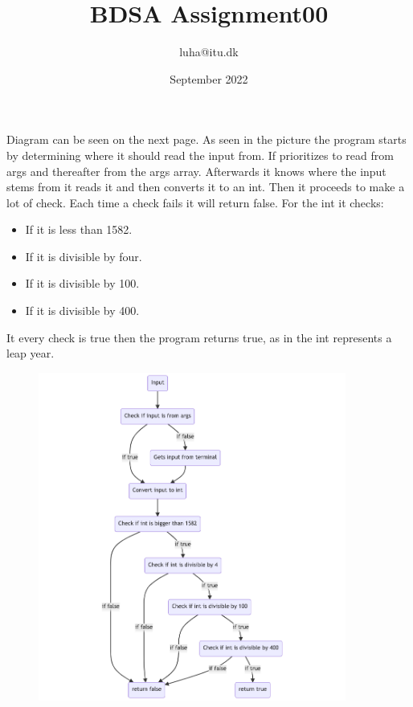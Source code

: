 \documentclass[12pt, a4paper]{article}
\title{BDSA Assignment00}
\author{luha@itu.dk}
\date{September 2022}
\begin{document}
\maketitle

Diagram can be seen on the next page. As seen in the picture the program starts by determining where it should read the input from. If prioritizes to read from args and thereafter from the args array. 
Afterwards it knows where the input stems from it reads it and then converts it to an int. 
Then it proceeds to make a lot of check. Each time a check fails it will return false. For the int it checks:
\begin{itemize}
\item If it is less than 1582.
\item If it is divisible by four.
\item If it is divisible by 100.
\item If it is divisible by 400.
\end{itemize}
It every check is true then the program returns true, as in the int represents a leap year. 

\begin{figure}
    \centering
    \includegraphics[width=0.9\textwidth, angle =-90 ]{mermaid-diagram-2022-09-06-114544.png}
\end{figure}
\end{document}
